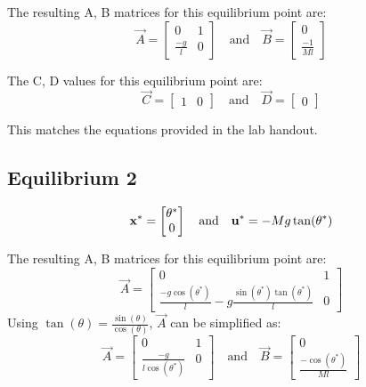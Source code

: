 \documentclass[10pt]{article}
\begin{document}
The resulting A, B matrices for this equilibrium point are:
\begin{equation}
        \vec{A} = 
        \begin{bmatrix}
        0 &1 \\ \frac{-g}{l} & 0
        \end{bmatrix}
        \quad
        \text{and}
        \quad
        \vec{B} = 
        \begin{bmatrix}
        0\\ \frac{-1}{Ml}
        \end{bmatrix}
\end{equation}

The C, D values for this equilibrium point are:
\begin{equation}
    \vec{C} = 
        \begin{bmatrix}
        1 & 0
        \end{bmatrix}
        \quad
        \text{and}
        \quad
        \vec{D} = 
        \begin{bmatrix}
        0
        \end{bmatrix}
\end{equation}

This matches the equations provided in the lab handout.
\subsection{Equilibrium 2}
\begin{equation}
        \mathbf{x}^* =
     \begin{bmatrix} \theta^* \\ 0 \end{bmatrix}
     \quad
     \text{and}
     \quad
     \mathbf{u}^* = -Mg\tan(\theta^*) 
\end{equation}

The resulting A, B matrices for this equilibrium point are:
\begin{equation*}
        \vec{A} = 
        \begin{bmatrix}
        0 &1 \\ \frac{-g\cos(\theta^*)}{l} - g \frac{\sin(\theta^*) \tan(\theta^*)}{l} & 0
        \end{bmatrix}
\end{equation*}
Using $\tan(\theta) = \frac{\sin(\theta)}{\cos(\theta)}$, $\vec{A}$ can be simplified as:
\begin{equation}
        \vec{A} =
        \begin{bmatrix}
        0 &1 \\ \frac{-g}{l\cos(\theta^*)} & 0
        \end{bmatrix}
        \quad
        \text{and}
        \quad
        \vec{B} = 
        \begin{bmatrix}
            0\\ \frac{-\cos(\theta^*)}{Ml}
        \end{bmatrix}
\end{equation}
\end{document}
